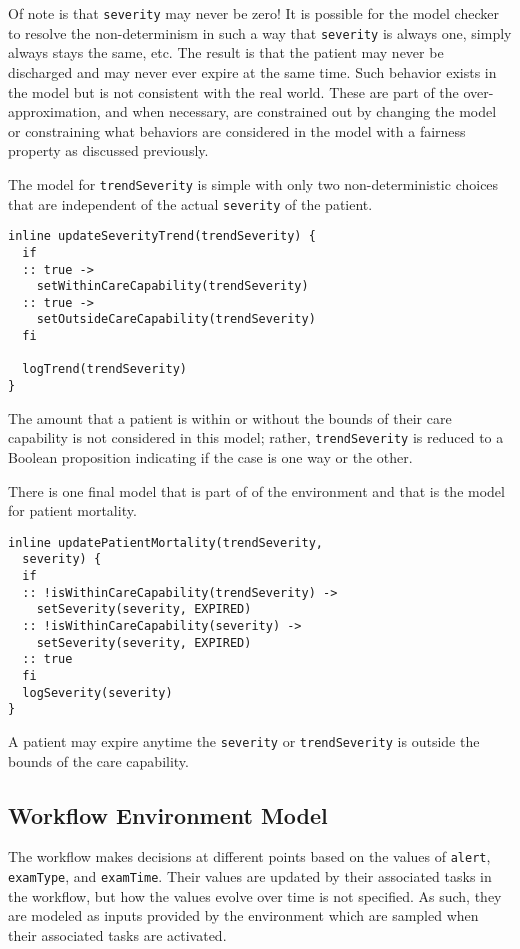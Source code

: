 Of note is that \texttt{severity} may never be zero! It is possible for the model checker to resolve the non-determinism in such a way that \texttt{severity} is always one, simply always stays the same, etc. The result is that the patient may never be discharged and may never ever expire at the same time. Such behavior exists in the model but is not consistent with the real world. These are part of the over-approximation, and when necessary, are constrained out by changing the model or constraining what behaviors are considered in the model with a fairness property as discussed previously.

The model for \texttt{trendSeverity} is simple with only two non-deterministic choices that are independent of the actual \texttt{severity} of the patient. 
%
{\small
\begin{lstlisting}[style=myPromela]
inline updateSeverityTrend(trendSeverity) {
  if
  :: true -> 
    setWithinCareCapability(trendSeverity)
  :: true -> 
    setOutsideCareCapability(trendSeverity)
  fi

  logTrend(trendSeverity)
}
\end{lstlisting}
}
%
\noindent The amount that a patient is within or without the bounds of their care capability is not considered in this model; rather, \texttt{trendSeverity} is reduced to a Boolean proposition indicating if the case is one way or the other.

There is one final model that is part of of the environment and that is the model for patient mortality. 
%
{\small
\begin{lstlisting}[style=myPromela]
inline updatePatientMortality(trendSeverity, 
  severity) {
  if
  :: !isWithinCareCapability(trendSeverity) -> 
    setSeverity(severity, EXPIRED)
  :: !isWithinCareCapability(severity) ->
    setSeverity(severity, EXPIRED)
  :: true
  fi
  logSeverity(severity)
}
\end{lstlisting}
}
%
\noindent A patient may expire anytime the \texttt{severity} or \texttt{trendSeverity} is outside the bounds of the care capability.

\subsection{Workflow Environment Model}

The workflow makes decisions at different points based on the values of \texttt{alert}, \texttt{examType}, and \texttt{examTime}. Their values are updated by their associated tasks in the workflow, but how the values evolve over time is not specified. As such, they are modeled as inputs provided by the environment which are sampled when their associated tasks are activated.

